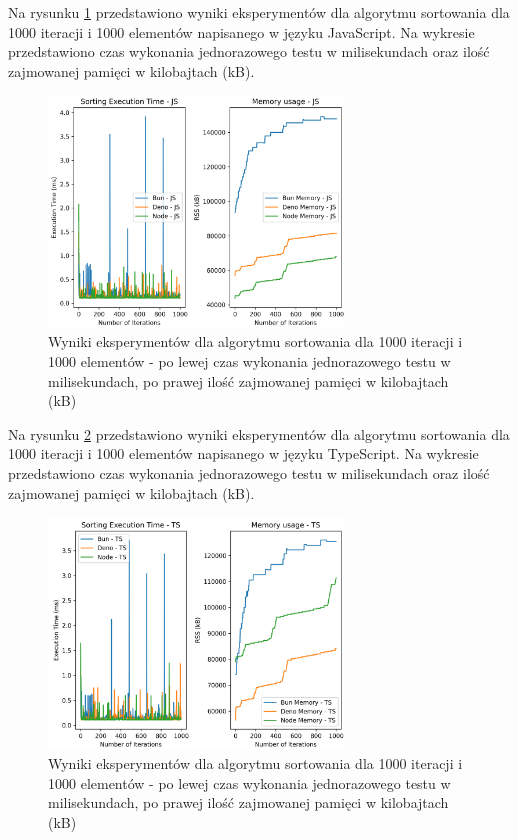 Na rysunku \ref{fig:radix_sorting_e3} przedstawiono wyniki eksperymentów dla algorytmu sortowania  dla 1000 iteracji i 1000 elementów napisanego w języku JavaScript. Na wykresie przedstawiono czas wykonania jednorazowego testu w milisekundach oraz ilość zajmowanej pamięci w kilobajtach (kB).

\begin{figure}[H]
  \centering
  \includegraphics[width=0.7\textwidth]{Figures/sorting/sorting_radix_1000_1000_js.png}
  \caption{Wyniki eksperymentów dla algorytmu sortowania  dla 1000 iteracji i 1000 elementów - po lewej czas wykonania jednorazowego testu w milisekundach, po prawej ilość zajmowanej pamięci w kilobajtach (kB)}
  \label{fig:radix_sorting_e3}
\end{figure}

Na rysunku \ref{fig:radix_sorting_e3_ts} przedstawiono wyniki eksperymentów dla algorytmu sortowania  dla 1000 iteracji i 1000 elementów napisanego w języku TypeScript. Na wykresie przedstawiono czas wykonania jednorazowego testu w milisekundach oraz ilość zajmowanej pamięci w kilobajtach (kB).

\begin{figure}[H]
  \centering
  \includegraphics[width=0.7\textwidth]{Figures/sorting/sorting_radix_1000_1000_ts.png}
  \caption{Wyniki eksperymentów dla algorytmu sortowania  dla 1000 iteracji i 1000 elementów - po lewej czas wykonania jednorazowego testu w milisekundach, po prawej ilość zajmowanej pamięci w kilobajtach (kB)}
  \label{fig:radix_sorting_e3_ts}
\end{figure}

